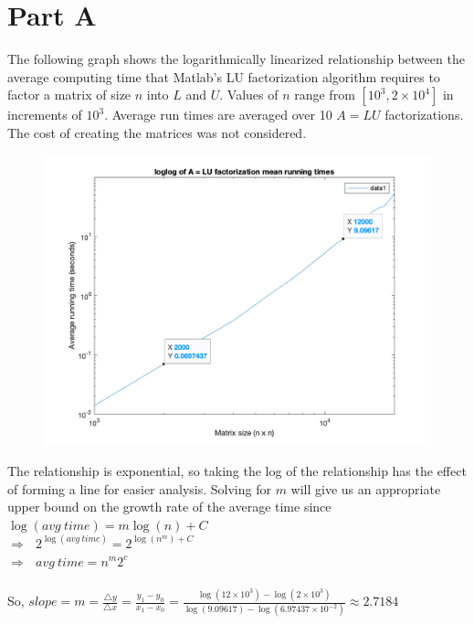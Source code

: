 \documentclass[11pt, oneside]{article}   	%
\date{}							%
\begin{document}
\section{Part A}
The following graph shows the logarithmically linearized relationship between the average computing time that Matlab's LU factorization algorithm requires to factor a matrix of size $n$ into $L$ and $U$. Values of $n$ range from $[10^3, 2 \times 10^4]$ in increments of $10^3$. Average run times are averaged over 10 $A = LU$ factorizations. The cost of creating the matrices was not considered. \\

\begin{figure}
\centering
\includegraphics [scale=.19] {Log_A_LU_Factorization_mean_running_times.png}
\end{figure}

The relationship is exponential, so taking the log of the relationship has the effect of forming a line for easier analysis. Solving for $m$ will give us an appropriate upper bound on the growth rate of the average time since \\

$\log(avg~time) = m\log(n) + C$ \\

$\Rightarrow ~~~ 2^{\log(avg~time)} = 2^{\log(n^m) + C}$ \\

$\Rightarrow ~~~ avg~time = n^m2^c$ \\\\

So, $slope = m = \frac{ \triangle y}{ \triangle x} = \frac{y_1 - y_0}{x_1 - x_0} = \frac{\log(12 \times 10^3) - \log(2 \times 10^3)}{\log(9.09617) - \log(6.97437 \times 10^{-2})} \approx 2.7184$ \\
\end{document}

